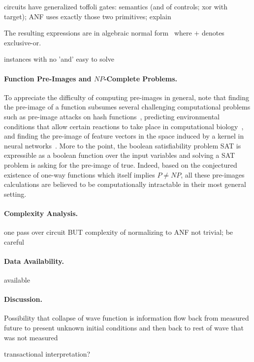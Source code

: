 \documentclass{article}
\begin{document}
\begin{refsection}
circuits have generalized toffoli gates: semantics (and of controls;
xor with target); ANF uses exactly those two primitives; explain

The resulting
expressions are in algebraic normal form~\cite{TOKAREVA20151} where
$+$ denotes exclusive-or. 

instances with no 'and' easy to solve


\paragraph*{Function Pre-Images and $\mathit{NP}$-Complete Problems.}
To appreciate the difficulty of computing pre-images in general, note
that finding the pre-image of a function subsumes several challenging
computational problems such as pre-image attacks on hash
functions~\cite{10.1007/978-3-540-25937-4_24}, predicting
environmental conditions that allow certain reactions to take place in
computational biology~\cite{Klotz2013,akutsu2009analyses}, and finding
the pre-image of feature vectors in the space induced by a kernel in
neural networks~\cite{1353287}. More to the point, the boolean
satisfiability problem SAT is expressible as a boolean function over
the input variables and solving a SAT problem is asking for the
pre-image of \textsf{true}. Indeed, based on the conjectured existence
of one-way functions which itself implies $\mathit{P} \neq
\mathit{NP}$, all these pre-images calculations are believed to be
computationally intractable in their most general setting.

\paragraph*{Complexity Analysis.}
one pass over circuit BUT complexity of normalizing to ANF not trivial; be careful

\paragraph*{Data Availability.} available 

\paragraph*{Discussion.}
Possibility that collapse of wave function is information flow back
from measured future to present unknown initial conditions and then
back to rest of wave that was not measured

transactional interpretation?


\end{refsection}
\end{document}
